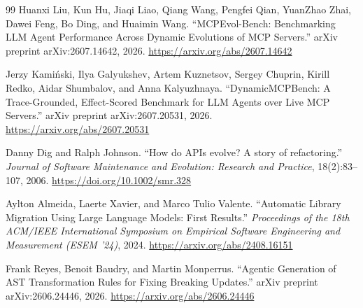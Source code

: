 \documentclass[11pt]{article}
\begin{document}
\begin{thebibliography}{99}
Huanxi Liu, Kun Hu, Jiaqi Liao, Qiang Wang, Pengfei Qian, YuanZhao Zhai,
Dawei Feng, Bo Ding, and Huaimin Wang.
``MCPEvol-Bench: Benchmarking LLM Agent Performance Across Dynamic Evolutions
of MCP Servers.''
arXiv preprint arXiv:2607.14642, 2026.
\url{https://arxiv.org/abs/2607.14642}

Jerzy Kami\'nski, Ilya Galyukshev, Artem Kuznetsov, Sergey Chuprin,
Kirill Redko, Aidar Shumbalov, and Anna Kalyuzhnaya.
``DynamicMCPBench: A Trace-Grounded, Effect-Scored Benchmark for LLM Agents
over Live MCP Servers.''
arXiv preprint arXiv:2607.20531, 2026.
\url{https://arxiv.org/abs/2607.20531}

Danny Dig and Ralph Johnson.
``How do APIs evolve? A story of refactoring.''
\emph{Journal of Software Maintenance and Evolution: Research and Practice},
18(2):83--107, 2006.
\url{https://doi.org/10.1002/smr.328}

Aylton Almeida, Laerte Xavier, and Marco Tulio Valente.
``Automatic Library Migration Using Large Language Models: First Results.''
\emph{Proceedings of the 18th ACM/IEEE International Symposium on Empirical
Software Engineering and Measurement (ESEM '24)}, 2024.
\url{https://arxiv.org/abs/2408.16151}

Frank Reyes, Benoit Baudry, and Martin Monperrus.
``Agentic Generation of AST Transformation Rules for Fixing Breaking Updates.''
arXiv preprint arXiv:2606.24446, 2026.
\url{https://arxiv.org/abs/2606.24446}

\end{thebibliography}
\end{document}
